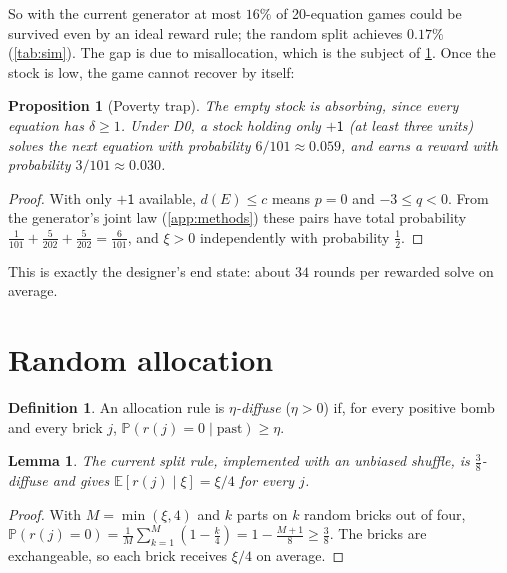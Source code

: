 \documentclass[11pt,a4paper]{article}
\newtheorem{lemma}[theorem]{Lemma}
\newtheorem{proposition}[theorem]{Proposition}
\theoremstyle{definition}
\newtheorem{definition}[theorem]{Definition}
\theoremstyle{remark}
\newcommand{\E}{\mathbb{E}}
\renewcommand{\P}{\mathbb{P}}
\newcommand{\pU}{\ensuremath{\mathord{+}\mathsf{1}}}
\begin{document}
So with the current generator at most $16\%$ of 20-equation games could be survived even
by an ideal reward rule; the random split achieves $0.17\%$ (\cref{tab:sim}). The gap is
due to misallocation, which is the subject of \cref{sec:random}. Once the stock is low,
the game cannot recover by itself:

\begin{proposition}[Poverty trap]\label{prop:trap}
The empty stock is absorbing, since every equation has $\delta\ge1$. Under D0, a stock
holding only $\pU$ (at least three units) solves the next equation with probability
$6/101\approx0.059$, and earns a reward with probability $3/101\approx0.030$.
\end{proposition}
\begin{proof}
With only $\pU$ available, $d(E)\le c$ means $p=0$ and $-3\le q<0$. From the
generator's joint law (\cref{app:methods}) these pairs have total probability
$\frac1{101}+\frac5{202}+\frac5{202}=\frac6{101}$, and $\xi>0$ independently with
probability $\frac12$.
\end{proof}

This is exactly the designer's end state: about $34$ rounds per rewarded solve on
average.

\section{Random allocation}\label{sec:random}

\begin{definition}
An allocation rule is \emph{$\eta$-diffuse} ($\eta>0$) if, for every positive bomb and
every brick $j$, $\P(r(j)=0\mid\text{past})\ge\eta$.
\end{definition}

\begin{lemma}\label{lem:diffuse}
The current split rule, implemented with an unbiased shuffle, is $\tfrac38$-diffuse and
gives $\E[r(j)\mid\xi]=\xi/4$ for every $j$.
\end{lemma}
\begin{proof}
With $M=\min(\xi,4)$ and $k$ parts on $k$ random bricks out of four,
$\P(r(j)=0)=\frac1M\sum_{k=1}^M(1-\frac k4)=1-\frac{M+1}8\ge\frac38$.
The bricks are exchangeable, so each brick receives $\xi/4$ on average.
\end{proof}
\end{document}
